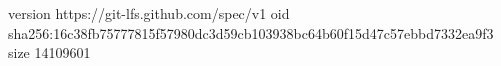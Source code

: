 version https://git-lfs.github.com/spec/v1
oid sha256:16c38fb75777815f57980dc3d59cb103938bc64b60f15d47c57ebbd7332ea9f3
size 14109601
